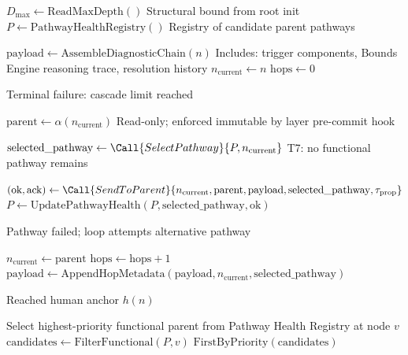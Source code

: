 \begin{algorithm}[t]
\caption{Escalation Algorithm}
\label{alg:escalation}
\begin{algorithmic}[1]
  \State $D_{\max} \gets \text{ReadMaxDepth}()$          \Comment Structural bound from root init
  \State $P \gets \text{PathwayHealthRegistry}()$      \Comment Registry of candidate parent pathways

  \State $\text{payload} \gets \text{AssembleDiagnosticChain}(n)$
  \Comment Includes: trigger components, Bounds Engine reasoning trace, resolution history
  \State $n_{\text{current}} \gets n$
  \State $\text{hops} \gets 0$

      \State \Return {}
      \Comment Terminal failure: cascade limit reached
    \EndIf

    \State $\text{parent} \gets \alpha(n_{\text{current}})$
    \Comment Read-only; enforced immutable by \fact{} layer pre-commit hook

    \State $\text{selected\_pathway} \gets \Call{SelectPathway}{P, n_{\text{current}}}$
      \State \Return {}
      \Comment T7: no functional pathway remains
    \EndIf

    \State $(\text{ok}, \text{ack}) \gets \Call{SendToParent}{
      n_{\text{current}}, \text{parent}, \text{payload}, \text{selected\_pathway}, \tau_{\text{prop}}}$
    \State $P \gets \text{UpdatePathwayHealth}(P, \text{selected\_pathway}, \text{ok})$

      \State \Comment Pathway failed; loop attempts alternative pathway
      \State \Continue
    \EndIf

    \State $n_{\text{current}} \gets \text{parent}$
    \State $\text{hops} \gets \text{hops} + 1$
    \State $\text{payload} \gets \text{AppendHopMetadata}(\text{payload}, n_{\text{current}}, \text{selected\_pathway})$
  \EndWhile

  \State \Comment Reached human anchor $h(n)$
  \State {}
  \State \Return {}
\EndFunction

\Statex
{}
  \State \Comment Select highest-priority functional parent from Pathway Health Registry at node $v$
  \State $\text{candidates} \gets \text{FilterFunctional}(P, v)$
  \State \Return $\text{FirstByPriority}(\text{candidates})$
\EndFunction
\end{algorithmic}
\end{algorithm}

